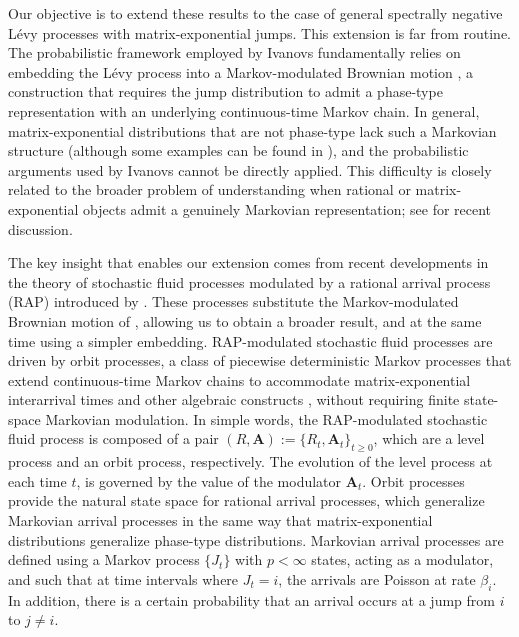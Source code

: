 \documentclass[a4paper,11pt]{article}
\numberwithin{equation}{section}
\theoremstyle{plain}
\theoremstyle{definition}
\newcommand{\1}{\mathbf{1}}
\begin{document}
Our objective is to extend these results to the case of general spectrally negative Lévy processes with matrix-exponential jumps. This extension is far from routine. The probabilistic framework employed by Ivanovs fundamentally relies on embedding the Lévy process into a Markov-modulated Brownian motion \citep{ivanovs2010markov,d2012two}, a construction that requires the jump distribution to admit a phase-type representation with an underlying continuous-time Markov chain. In general, matrix-exponential distributions that are not phase-type lack such a Markovian structure (although some examples can be found in \cite{peralta2023markov}), and the probabilistic arguments used by Ivanovs cannot be directly applied. This difficulty is closely related to the broader problem of understanding when rational or matrix-exponential objects admit a genuinely Markovian representation; see \cite{asmussen2022ph,telek2022two,peralta2026rational} for recent discussion.

The key insight that enables our extension comes from recent developments in the theory of stochastic fluid processes modulated by a rational arrival process (RAP) introduced by \cite{BeanNguyenNielsenPeralta2022}. These processes substitute the Markov-modulated Brownian motion of \citep{Ivanovs2021}, allowing us to obtain a broader result, and at the same time using a simpler embedding. RAP-modulated stochastic fluid processes are driven by orbit processes, a class of piecewise deterministic Markov processes that extend continuous-time Markov chains to accommodate matrix-exponential interarrival times and other algebraic constructs   \cite{AsmussenBladt1999,bean2010quasi,BuchholzTelek2013}, without requiring finite state-space Markovian modulation. 
In simple words, the RAP-modulated stochastic fluid process is composed of a pair $(R,\bm{A}):=\{R_t,\bm{A}_t\}_{t\geq 0}$, which are a level process and an orbit process, respectively. The evolution of the level process at each time $t$, is governed by the value of the  modulator $\bm{A}_t$. 
Orbit processes provide the natural state space for rational arrival processes, which generalize Markovian arrival processes  in the same way that matrix-exponential distributions generalize phase-type distributions.
Markovian arrival processes are defined using a Markov process $\{J_t\}$ with $p<\infty$ states, acting as a modulator, and such that at time intervals where $J_t=i$, the arrivals are Poisson at rate $\beta_i$. In addition, there is a certain probability that an arrival occurs at a jump from $i$ to $j\neq i$. 
\end{document}

